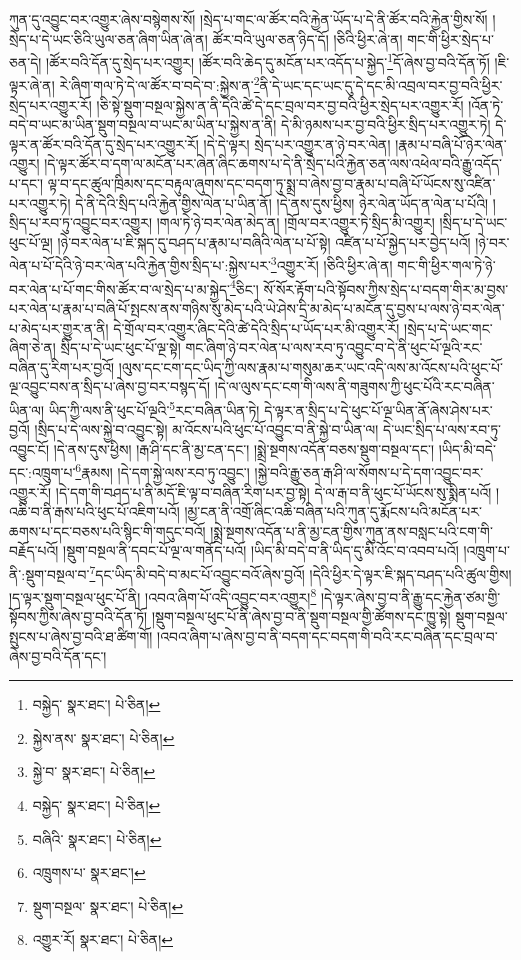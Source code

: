 ཀུན་དུ་འབྱུང་བར་འགྱུར་ཞེས་བསྙེགས་སོ། །སྲེད་པ་གང་ལ་ཚོར་བའི་རྐྱེན་ཡོད་པ་དེ་ནི་ཚོར་བའི་རྐྱེན་གྱིས་སོ། །སྲེད་པ་དེ་ཡང་ཅིའི་ཡུལ་ཅན་ཞིག་ཡིན་ཞེ་ན། ཚོར་བའི་ཡུལ་ཅན་ཉིད་དོ། །ཅིའི་ཕྱིར་ཞེ་ན། གང་གི་ཕྱིར་སྲེད་པ་ཅན་དེ། །ཚོར་བའི་དོན་དུ་སྲེད་པར་འགྱུར། །ཚོར་བའི་ཆེད་དུ་མངོན་པར་འདོད་པ་སྐྱེད་\footnote{བསྐྱེད་  སྣར་ཐང་།  པེ་ཅིན། }དོ་ཞེས་བྱ་བའི་དོན་ཏོ། །ཇི་ལྟར་ཞེ་ན། རེ་ཞིག་གལ་ཏེ་དེ་ལ་ཚོར་བ་བདེ་བ་:སྐྱེས་ན་\footnote{སྐྱེས་ནས་  སྣར་ཐང་།  པེ་ཅིན། }ནི་དེ་ཡང་དང་ཡང་དུ་དེ་དང་མི་འབྲལ་བར་བྱ་བའི་ཕྱིར་སྲེད་པར་འགྱུར་རོ། །ཅི་སྟེ་སྡུག་བསྔལ་སྐྱེས་ན་ནི་དེའི་ཚེ་དེ་དང་བྲལ་བར་བྱ་བའི་ཕྱིར་སྲེད་པར་འགྱུར་རོ། །འོན་ཏེ་བདེ་བ་ཡང་མ་ཡིན་སྡུག་བསྔལ་བ་ཡང་མ་ཡིན་པ་སྐྱེས་ན་ནི། དེ་མི་ཉམས་པར་བྱ་བའི་ཕྱིར་སྲིད་པར་འགྱུར་ཏེ། དེ་ལྟར་ན་ཚོར་བའི་དོན་དུ་སྲེད་པར་འགྱུར་རོ། །དེ་དེ་ལྟར། སྲེད་པར་འགྱུར་ན་ཉེ་བར་ལེན། །རྣམ་པ་བཞི་པོ་ཉེར་ལེན་འགྱུར། །དེ་ལྟར་ཚོར་བ་དག་ལ་མངོན་པར་ཞེན་ཞིང་ཆགས་པ་དེ་ནི་སྲེད་པའི་རྐྱེན་ཅན་ལས་འཕེལ་བའི་རྒྱུ་འདོད་པ་དང་། ལྟ་བ་དང་ཚུལ་ཁྲིམས་དང་བརྟུལ་ཞུགས་དང་བདག་ཏུ་སྨྲ་བ་ཞེས་བྱ་བ་རྣམ་པ་བཞི་པོ་ཡོངས་སུ་འཛིན་པར་འགྱུར་ཏེ། དེ་ནི་དེའི་སྲིད་པའི་རྐྱེན་གྱིས་ལེན་པ་ཡིན་ནོ། །དེ་ནས་དུས་ཕྱིས། ཉེར་ལེན་ཡོད་ན་ལེན་པ་པོའི། །སྲིད་པ་རབ་ཏུ་འབྱུང་བར་འགྱུར། །གལ་ཏེ་ཉེ་བར་ལེན་མེད་ན། །གྲོལ་བར་འགྱུར་ཏེ་སྲིད་མི་འགྱུར། །སྲིད་པ་དེ་ཡང་ཕུང་པོ་ལྔ། །ཉེ་བར་ལེན་པ་ཇི་སྐད་དུ་བཤད་པ་རྣམ་པ་བཞིའི་ལེན་པ་པོ་སྟེ། འཛིན་པ་པོ་སྐྱེད་པར་བྱེད་པའོ། །ཉེ་བར་ལེན་པ་པོ་དེའི་ཉེ་བར་ལེན་པའི་རྐྱེན་གྱིས་སྲིད་པ་:སྐྱེས་པར་\footnote{སྐྱེ་བ་  སྣར་ཐང་།  པེ་ཅིན། }འགྱུར་རོ། །ཅིའི་ཕྱིར་ཞེ་ན། གང་གི་ཕྱིར་གལ་ཏེ་ཉེ་བར་ལེན་པ་པོ་གང་གིས་ཚོར་བ་ལ་སྲེད་པ་མ་སྐྱེད་\footnote{བསྐྱེད་  སྣར་ཐང་།  པེ་ཅིན། }ཅིང་། སོ་སོར་རྟོག་པའི་སྟོབས་ཀྱིས་སྲེད་པ་བདག་གིར་མ་བྱས་པར་ལེན་པ་རྣམ་པ་བཞི་པོ་སྤངས་ནས་གཉིས་སུ་མེད་པའི་ཡེ་ཤེས་དྲི་མ་མེད་པ་མངོན་དུ་བྱས་པ་ལས་ཉེ་བར་ལེན་པ་མེད་པར་གྱུར་ན་ནི། དེ་གྲོལ་བར་འགྱུར་ཞིང་དེའི་ཚེ་དེའི་སྲིད་པ་ཡོད་པར་མི་འགྱུར་རོ། །སྲེད་པ་དེ་ཡང་གང་ཞིག་ཅེ་ན། སྲིད་པ་དེ་ཡང་ཕུང་པོ་ལྔ་སྟེ། གང་ཞིག་ཉེ་བར་ལེན་པ་ལས་རབ་ཏུ་འབྱུང་བ་དེ་ནི་ཕུང་པོ་ལྔའི་རང་བཞིན་དུ་རིག་པར་བྱའོ། །ལུས་དང་ངག་དང་ཡིད་ཀྱི་ལས་རྣམ་པ་གསུམ་ཆར་ཡང་འདི་ལས་མ་འོངས་པའི་ཕུང་པོ་ལྔ་འབྱུང་བས་ན་སྲིད་པ་ཞེས་བྱ་བར་བསྙད་དོ། །དེ་ལ་ལུས་དང་ངག་གི་ལས་ནི་གཟུགས་ཀྱི་ཕུང་པོའི་རང་བཞིན་ཡིན་ལ། ཡིད་ཀྱི་ལས་ནི་ཕུང་པོ་ལྔའི་\footnote{བཞིའི་  སྣར་ཐང་།  པེ་ཅིན། }རང་བཞིན་ཡིན་ཏེ། དེ་ལྟར་ན་སྲིད་པ་དེ་ཕུང་པོ་ལྔ་ཡིན་ནོ་ཞེས་ཤེས་པར་བྱའོ། །སྲིད་པ་དེ་ལས་སྐྱེ་བ་འབྱུང་སྟེ། མ་འོངས་པའི་ཕུང་པོ་འབྱུང་བ་ནི་སྐྱེ་བ་ཡིན་ལ། དེ་ཡང་སྲིད་པ་ལས་རབ་ཏུ་འབྱུང་ངོ། །དེ་ནས་དུས་ཕྱིས། །རྒ་ཤི་དང་ནི་མྱ་ངན་དང་། །སྨྲེ་སྔགས་འདོན་བཅས་སྡུག་བསྔལ་དང་། །ཡིད་མི་བདེ་དང་:འཁྲུག་པ་\footnote{འཁྲུགས་པ་  སྣར་ཐང་། }རྣམས། །དེ་དག་སྐྱེ་ལས་རབ་ཏུ་འབྱུང་། །སྐྱེ་བའི་རྒྱུ་ཅན་རྒ་ཤི་ལ་སོགས་པ་དེ་དག་འབྱུང་བར་འགྱུར་རོ། །དེ་དག་གི་བཤད་པ་ནི་མདོ་ཇི་ལྟ་བ་བཞིན་རིག་པར་བྱ་སྟེ། དེ་ལ་རྒ་བ་ནི་ཕུང་པོ་ཡོངས་སུ་སྨིན་པའོ། །འཆི་བ་ནི་རྒས་པའི་ཕུང་པོ་འཇིག་པའོ། །མྱ་ངན་ནི་འགྲོ་ཞིང་འཆི་བཞིན་པའི་ཀུན་དུ་རྨོངས་པའི་མངོན་པར་ཆགས་པ་དང་བཅས་པའི་སྙིང་གི་གདུང་བའོ། །སྨྲེ་སྔགས་འདོན་པ་ནི་མྱ་ངན་གྱིས་ཀུན་ནས་བསླང་པའི་ངག་གི་བརྗོད་པའོ། །སྡུག་བསྔལ་ནི་དབང་པོ་ལྔ་ལ་གནོད་པའོ། །ཡིད་མི་བདེ་བ་ནི་ཡིད་དུ་མི་འོང་བ་འབབ་པའོ། །འཁྲུག་པ་ནི་:སྡུག་བསྔལ་བ་\footnote{སྡུག་བསྔལ་  སྣར་ཐང་།  པེ་ཅིན། }དང་ཡིད་མི་བདེ་བ་མང་པོ་འབྱུང་བའོ་ཞེས་བྱའོ། །དེའི་ཕྱིར་དེ་ལྟར་ཇི་སྐད་བཤད་པའི་ཚུལ་གྱིས། །ད་ལྟར་སྡུག་བསྔལ་ཕུང་པོ་ནི། །འབའ་ཞིག་པོ་འདི་འབྱུང་བར་འགྱུར།\footnote{འགྱུར་རོ།  སྣར་ཐང་།  པེ་ཅིན། } །དེ་ལྟར་ཞེས་བྱ་བ་ནི་རྒྱུ་དང་རྐྱེན་ཙམ་གྱི་སྟོབས་ཀྱིས་ཞེས་བྱ་བའི་དོན་ཏོ། །སྡུག་བསྔལ་ཕུང་པོ་ནི་ཞེས་བྱ་བ་ནི་སྡུག་བསྔལ་གྱི་ཚོགས་དང་ཁྱུ་སྟེ། སྡུག་བསྔལ་སྤུངས་པ་ཞེས་བྱ་བའི་ཐ་ཚིག་གོ། །འབའ་ཞིག་པ་ཞེས་བྱ་བ་ནི་བདག་དང་བདག་གི་བའི་རང་བཞིན་དང་བྲལ་བ་ཞེས་བྱ་བའི་དོན་དང་། 